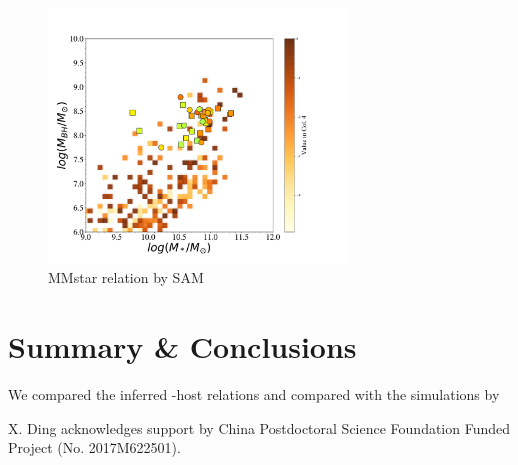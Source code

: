 \documentclass[twocolumn]{aastex62}
\begin{document}
\begin{figure}[t]
\centering
\includegraphics[width =  8cm]{SAM_MMstar.pdf}
\caption{MMstar relation by SAM }
\label{fig:SAM_MM}
\end{figure}



\section{Summary \& Conclusions} \label{sec:summary}
We compared the inferred \mbh-host relations and compared with the simulations by 


\acknowledgments

X. Ding acknowledges support by China Postdoctoral Science Foundation Funded Project (No. 2017M622501).



\newpage




%
\end{document}
